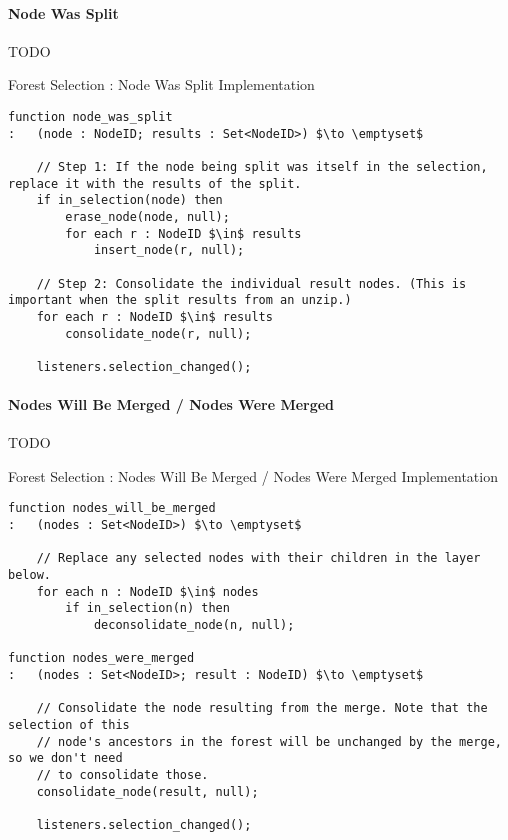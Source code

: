 \paragraph{Node Was Split}

TODO

\begin{stulisting}[p]
\caption{Forest Selection : Node Was Split Implementation}
\label{code:ipfs-selection-nodewassplit}
\begin{lstlisting}[style=Default]
function node_was_split
:	(node : NodeID; results : Set<NodeID>) $\to \emptyset$

	// Step 1: If the node being split was itself in the selection, replace it with the results of the split.
	if in_selection(node) then
		erase_node(node, null);
		for each r : NodeID $\in$ results
			insert_node(r, null);

	// Step 2: Consolidate the individual result nodes. (This is important when the split results from an unzip.)
	for each r : NodeID $\in$ results
		consolidate_node(r, null);

	listeners.selection_changed();
\end{lstlisting}
\end{stulisting}

\paragraph{Nodes Will Be Merged / Nodes Were Merged}

TODO

\begin{stulisting}[p]
\caption{Forest Selection : Nodes Will Be Merged / Nodes Were Merged Implementation}
\label{code:ipfs-selection-nodesmerged}
\begin{lstlisting}[style=Default]
function nodes_will_be_merged
:	(nodes : Set<NodeID>) $\to \emptyset$

	// Replace any selected nodes with their children in the layer below.
	for each n : NodeID $\in$ nodes
		if in_selection(n) then
			deconsolidate_node(n, null);

function nodes_were_merged
:	(nodes : Set<NodeID>; result : NodeID) $\to \emptyset$

	// Consolidate the node resulting from the merge. Note that the selection of this
	// node's ancestors in the forest will be unchanged by the merge, so we don't need
	// to consolidate those.
	consolidate_node(result, null);

	listeners.selection_changed();
\end{lstlisting}
\end{stulisting}


